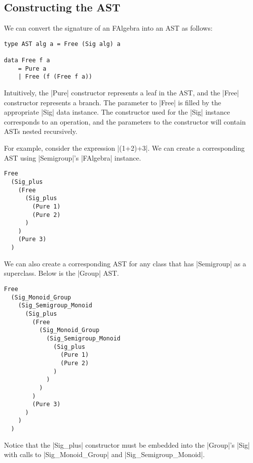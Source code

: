 \documentclass[preprint]{sigplanconf}
\theoremstyle{definition}
\begin{document}

\subsection{Constructing the AST}

We can convert the signature of an FAlgebra into an AST as follows:
\begin{lstlisting}
type AST alg a = Free (Sig alg) a

data Free f a
    = Pure a
    | Free (f (Free f a))
\end{lstlisting}
Intuitively,
the |Pure| constructor represents a leaf in the AST,
and the |Free| constructor represents a branch.
The parameter to |Free| is filled by the appropriate |Sig| data instance.
The constructor used for the |Sig| instance corresponds to an operation,
and the parameters to the constructor will contain ASTs nested recursively.

For example, consider the expression |(1+2)+3|.
We can create a corresponding AST using |Semigroup|'s |FAlgebra| instance.
\begin{lstlisting}
Free
  (Sig_plus
    (Free
      (Sig_plus
        (Pure 1)
        (Pure 2)
      )
    )
    (Pure 3)
  )
\end{lstlisting}
We can also create a corresponding AST for any class that has |Semigroup| as a superclass.
Below is the |Group| AST.
\begin{lstlisting}
Free
  (Sig_Monoid_Group
    (Sig_Semigroup_Monoid
      (Sig_plus
        (Free
          (Sig_Monoid_Group
            (Sig_Semigroup_Monoid
              (Sig_plus
                (Pure 1)
                (Pure 2)
              )
            )
          )
        )
        (Pure 3)
      )
    )
  )
\end{lstlisting}
Notice that the |Sig_plus| constructor must be embedded into the |Group|'s |Sig| with calls to |Sig_Monoid_Group| and |Sig_Semigroup_Monoid|.
\end{document}
